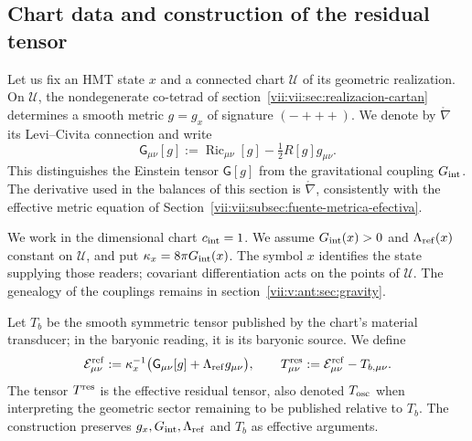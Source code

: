 \subsection{Chart data and construction of the residual tensor}
\label{vii:vii:subsec:datos-tensor-residual}

Let us fix an HMT state \(x\) and a connected chart \(\mathcal U\) of its
geometric realization. On \(\mathcal U\), the nondegenerate co-tetrad
of section~\ref{vii:vii:sec:realizacion-cartan} determines a smooth metric
\(g=g_x\) of signature \((-+++)\). We denote by
\(\mathring\nabla\) its Levi--Civita connection and write
\[
 \mathsf G_{\mu\nu}[g]
 :=\operatorname{Ric}_{\mu\nu}[g]-\tfrac12R[g]g_{\mu\nu}.
\]
This distinguishes the Einstein tensor \(\mathsf G[g]\) from
the gravitational coupling \(G_{\rm int}\). The derivative used
in the balances of this section is \(\mathring\nabla\),
consistently with the effective metric equation of
Section~\ref{vii:vii:subsec:fuente-metrica-efectiva}.

We work in the dimensional chart \(c_{\rm int}=1\). We assume
\(G_{\rm int}(x)>0\) and \(\Lambda_{\rm ref}(x)\) constant on
\(\mathcal U\), and put \(\kappa_x=8\pi G_{\rm int}(x)\).
The symbol \(x\) identifies the state supplying those readers;
covariant differentiation acts on the points of \(\mathcal U\).
The genealogy of the couplings remains in
section~\ref{vii:v:ant:sec:gravity}.

Let \(T_b\) be the smooth symmetric tensor published by the chart's material
transducer; in the baryonic reading, it is its baryonic source. We define
\begin{equation}
 \mathcal E^{\rm ref}_{\mu\nu}
 :=\kappa_x^{-1}\bigl(\mathsf G_{\mu\nu}[g]
                            +\Lambda_{\rm ref}g_{\mu\nu}\bigr),
 \qquad
 T^{\rm res}_{\mu\nu}:=\mathcal E^{\rm ref}_{\mu\nu}-T_{b,\mu\nu}.
 \label{vii:vii:eq:residual-definicion}
\end{equation}
The tensor \(T^{\rm res}\) is the effective residual tensor, also
denoted \(T_{\rm osc}\) when interpreting the geometric sector remaining
to be published relative to \(T_b\). The construction preserves
\(g_x,G_{\rm int},\Lambda_{\rm ref}\) and \(T_b\) as effective arguments.

